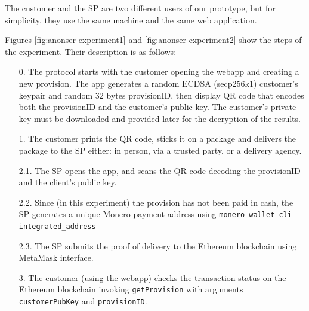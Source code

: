 The customer and the SP are two different users of our prototype, but for simplicity, they use the same machine and the same web application.

Figures \ref{fig:anonser-experiment1} and \ref{fig:anonser-experiment2} show the steps of the experiment. Their description is as follows:

\begin{enumerate}
  \setcounter{enumi}{0}
  \item[0.] The protocol starts with the customer opening the webapp and creating a new provision. 
The app generates a random ECDSA (secp256k1) customer's keypair and random 32 bytes provisionID, then display QR code that encodes both the provisionID and the customer's public key. 
The customer's private key must be downloaded and provided later for the decryption of the results.

  \item[1.] The customer prints the QR code, sticks it on a package and delivers the package to the SP either: in person, via a trusted party, or a delivery agency.

  \item[2.1.] The SP opens the app, and scans the QR code decoding the provisionID and the client's public key.

  \item[2.2.] Since (in this experiment) the provision has not been paid in cash, the SP generates a unique Monero payment address using \texttt{monero-wallet-cli integrated\_address} 
  \item[2.3.] The SP submits the proof of delivery to the Ethereum blockchain using MetaMask interface. 

  \item[3.] The customer (using the webapp) checks the transaction status on the Ethereum blockchain invoking \texttt{getProvision} with arguments \texttt{customerPubKey} and \texttt{provisionID}.


\end{enumerate}
